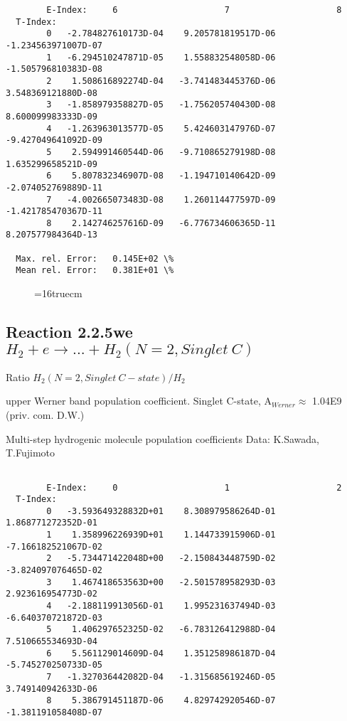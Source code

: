 \documentclass[12pt,dvipdfmx]{article}
\begin{document}
{\begin{small}
\begin{verbatim}
        E-Index:     6                     7                     8
  T-Index:
        0   -2.784827610173D-04    9.205781819517D-06   -1.234563971007D-07
        1   -6.294510247871D-05    1.558832548058D-06   -1.505796810383D-08
        2    1.508616892274D-04   -3.741483445376D-06    3.548369121880D-08
        3   -1.858979358827D-05   -1.756205740430D-08    8.600099983333D-09
        4   -1.263963013577D-05    5.424603147976D-07   -9.427049641092D-09
        5    2.594991460544D-06   -9.710865279198D-08    1.635299658521D-09
        6    5.807832346907D-08   -1.194710140642D-09   -2.074052769889D-11
        7   -4.002665073483D-08    1.260114477597D-09   -1.421785470367D-11
        8    2.142746257616D-09   -6.776734606365D-11    8.207577984364D-13

  Max. rel. Error:   0.145E+02 \%
  Mean rel. Error:   0.381E+01 \%

\end{verbatim}\end{small}
\begin{figure} \label{2.2.5fu}
\epsfxsize=16truecm
\end{figure}

\newpage

\subsection{
Reaction 2.2.5we $H_2 + e \rightarrow ...+ H_2(N=2,Singlet \ C)$}

Ratio $H_2(N=2, Singlet \ C-state)/H_2 $

upper Werner band population coefficient. Singlet C-state, A$_{Werner} \approx $ 1.04E9 (priv. com. D.W.)

 Multi-step hydrogenic molecule population coefficients
 Data: K.Sawada, T.Fujimoto \cite{kn:Sawada}
\begin{small}\begin{verbatim}

        E-Index:     0                     1                     2
  T-Index:
        0   -3.593649328832D+01    8.308979586264D-01    1.868771272352D-01
        1    1.358996226939D+01    1.144733915906D-01   -7.166182521067D-02
        2   -5.734471422048D+00   -2.150843448759D-02   -3.824097076465D-02
        3    1.467418653563D+00   -2.501578958293D-03    2.923616954773D-02
        4   -2.188119913056D-01    1.995231637494D-03   -6.640370721872D-03
        5    1.406297652325D-02   -6.783126412988D-04    7.510665534693D-04
        6    5.561129014609D-04    1.351258986187D-04   -5.745270250733D-05
        7   -1.327036442082D-04   -1.315685619246D-05    3.749140942633D-06
        8    5.386791451187D-06    4.829742920546D-07   -1.381191058408D-07


\end{verbatim}
\end{small}}
\end{document}

